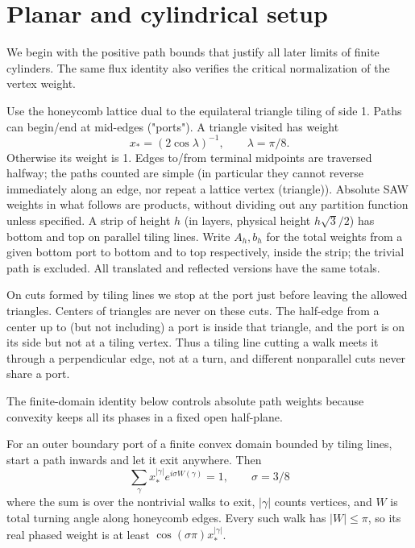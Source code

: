 \section{Planar and cylindrical setup}\label{c01-c1-planar-and-cylindrical-setup}

We begin with the positive path bounds that justify all later limits of finite cylinders. The same flux identity also verifies the critical normalization of the vertex weight.

Use the honeycomb lattice dual to the equilateral triangle tiling of side 1. Paths can begin/end at mid-edges ("ports"). A triangle visited has weight
\[
 x_*=(2\cos\lambda)^{-1},\qquad \lambda=\pi/8.
\]
Otherwise its weight is 1. Edges to/from terminal midpoints are traversed halfway; the paths counted are simple (in particular they cannot reverse immediately along an edge, nor repeat a lattice vertex (triangle)). Absolute SAW weights in what follows are products, without dividing out any partition function unless specified. A strip of height \(h\) (in layers, physical height \(h\sqrt3/2\)) has bottom and top on parallel tiling lines. Write \(A_h,b_h\) for the total weights from a given bottom port to bottom and to top respectively, inside the strip; the trivial path is excluded. All translated and reflected versions have the same totals.

On cuts formed by tiling lines we stop at the port just before leaving the allowed triangles. Centers of triangles are never on these cuts. The half-edge from a center up to (but not including) a port is inside that triangle, and the port is on its side but not at a tiling vertex. Thus a tiling line cutting a walk meets it through a perpendicular edge, not at a turn, and different nonparallel cuts never share a port.

The finite-domain identity below controls absolute path weights because convexity keeps all its phases in a fixed open half-plane.

\begin{lemma}\label{lem:pv:flux}
For an outer boundary port of a finite convex domain bounded by tiling lines, start a path inwards and let it exit anywhere. Then
\[
 \sum_\gamma x_*^{|\gamma|} e^{i\sigma W(\gamma)}=1,\qquad \sigma=3/8
\]
where the sum is over the nontrivial walks to exit, \(|\gamma|\) counts vertices, and \(W\) is total turning angle along honeycomb edges. Every such walk has \(|W|\le\pi\), so its real phased weight is at least \(\cos(\sigma\pi)x_*^{|\gamma|}\).
\end{lemma}

